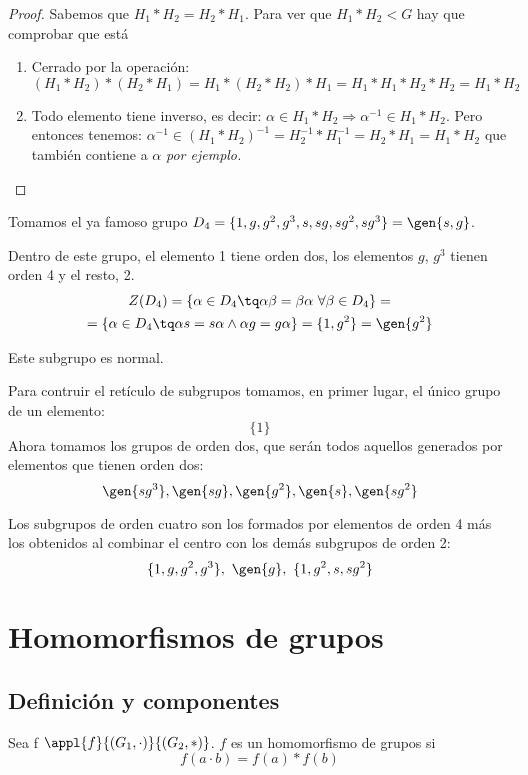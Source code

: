 \documentclass[nochap]{apuntes}
\begin{document}
 \begin{proof}
  Sabemos que $H_{1}\ast H_{2}=H_{2}\ast H_{1}$. Para ver que $H_{1}\ast H_{2}<G$  hay que comprobar que está
  \begin{enumerate}
   \item Cerrado por la operación: $(H_{1}\ast H_{2})\ast (H_{2}\ast H_{1})=H_{1}\ast (H_{2}\ast H_{2})\ast H_{1}=H_{1}\ast H_{1}\ast H_{2}\ast H_{2}=H_{1}\ast H_{2}$
   \item Todo elemento tiene inverso, es decir: $\alpha\in H_{1}\ast H_{2}\Rightarrow \alpha^{-1}\in H_{1}\ast H_{2}$. Pero entonces tenemos:
   $\alpha^{-1}\in (H_{1}\ast H_{2})^{-1} = H_{2}^{-1}\ast H_{1}^{-1}=H_{2}\ast H_{1}=H_{1}\ast H_{2}$ que también contiene a $\alpha$ \textit{por ejemplo.}
  \end{enumerate}

 \end{proof}

 \begin{example}
  Tomamos el ya famoso grupo $D_{4}=\{1,g,g^{2},g^{3}, s, sg, sg^{2}, sg^{3}\}=\gen{s,g}$.

  Dentro de este grupo, el elemento 1 tiene orden dos, los elementos $g$, $g^{3}$  tienen orden 4 y el resto, 2.
  \begin{gather*}
  Z(D_{4})= \{\alpha\in D_{4} \tq \alpha\beta=\beta\alpha \ \forall \beta \in D_{4}\}= \\
  = \{\alpha\in D_{4}\tq \alpha s = s\alpha \wedge \alpha g = g\alpha\}=\{1, g^{2}\}=\gen{g^{2}}
  \end{gather*}

  Este subgrupo es normal.

  Para contruir el retículo de subgrupos tomamos, en primer lugar, el único grupo de un elemento:
  \[ \{1\} \]
  Ahora tomamos los grupos de orden dos, que serán todos aquellos generados por elementos que tienen orden dos:\\
  \[ \gen{sg^{3}}, \gen{sg}, \gen{g^{2}}, \gen{s}, \gen{sg^{2}} \]

  Los subgrupos de orden cuatro son los formados por elementos de orden 4 más los obtenidos al combinar el centro con los demás subgrupos de orden 2:
  \[ \{1,g,g^{2},g^{3}\}, \ \gen{g}, \ \{1, g^{2}, s, sg^{2}\} \]
 \end{example}

\section{Homomorfismos de grupos}
\subsection{Definición y componentes}
\begin{defn}[Homomorfismo]
 Sea f $\appl{f}{(G_1, \cdot )}{(G_2, \ast )}$. $f$ es un homomorfismo de grupos si
 \[ f(a\cdot b) = f(a)\ast f(b) \]
 \end{defn}
\end{document}
